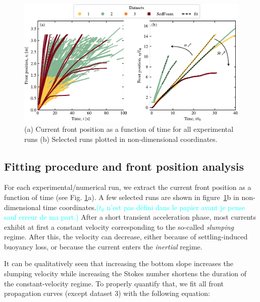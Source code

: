\documentclass[twocolumn]{article}
\newcommand*{\marie}{\textcolor{Cyan}}
\begin{document}
\begin{figure}[ht]
	\centering
	\includegraphics{figure3.pdf}
	\caption{(a) Current front position as a function of time for all experimental runs (b) Selected runs plotted in non-dimensional coordinates.}
	\label{fig:fig3}
\end{figure}

\subsection{Fitting procedure and front position analysis}

For each experimental/numerical run, we extract the current front position as a function of time (see Fig. \ref{fig:fig3}a). A few selected runs are shown in figure~\ref{fig:fig3}b in non-dimensional time coordinates.\marie{($t_0$ n'est pas défini dans le papier avant je pense sauf erreur de ma part.)} After a short transient acceleration phase, most currents exhibit at first a constant velocity corresponding to the so-called \emph{slumping} regime. After this, the velocity can decrease, either because of settling-induced buoyancy loss, or because the current enters the \emph{inertial} regime.

It can be qualitatively seen that increasing the bottom slope increases the slumping velocity while increasing the Stokes number shortens the duration of the constant-velocity regime.
%
To properly quantify that, we fit all front propagation curves (except dataset 3) with the following equation:
\end{document}
